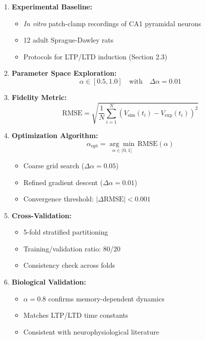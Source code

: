 \documentclass[a4paper,12pt]{article}
\begin{document}
\begin{enumerate}[leftmargin=*]
    \item \textbf{Experimental Baseline:}
    \begin{itemize}
        \item \textit{In vitro} patch-clamp recordings of CA1 pyramidal neurons
        \item 12 adult Sprague-Dawley rats
        \item Protocols for LTP/LTD induction (Section 2.3)
    \end{itemize}
    
    \item \textbf{Parameter Space Exploration:}
    \[
    \alpha \in [0.5, 1.0] \quad \text{with} \quad \Delta\alpha = 0.01
    \]
    
    \item \textbf{Fidelity Metric:}
    \[
    \text{RMSE} = \sqrt{\frac{1}{N}\sum_{i=1}^{N} \left(V_{\text{sim}}(t_i) - V_{\text{exp}}(t_i)\right)^2}
    \]
    
    \item \textbf{Optimization Algorithm:}
    \begin{equation}
    \alpha_{\text{opt}} = \underset{\alpha \in (0,1]}{\arg\min} \, \text{RMSE}(\alpha)
    \end{equation}
    
    \begin{itemize}
        \item Coarse grid search ($\Delta\alpha = 0.05$)
        \item Refined gradient descent ($\Delta\alpha = 0.01$)
        \item Convergence threshold: $|\Delta\text{RMSE}| < 0.001$
    \end{itemize}
    
    \item \textbf{Cross-Validation:}
    \begin{itemize}
        \item 5-fold stratified partitioning
        \item Training/validation ratio: 80/20
        \item Consistency check across folds
    \end{itemize}
    
    \item \textbf{Biological Validation:}
    \begin{itemize}
        \item $\alpha = 0.8$ confirms memory-dependent dynamics
        \item Matches LTP/LTD time constants
        \item Consistent with neurophysiological literature
    \end{itemize}
\end{enumerate}
\end{document}

